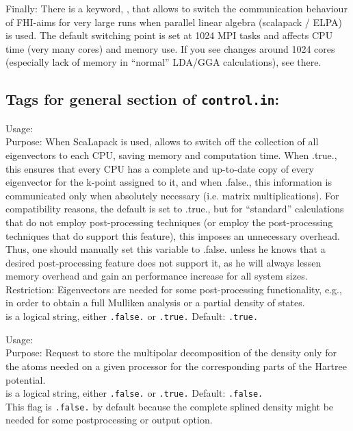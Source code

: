Finally: There is a keyword, , that allows
to switch the communication behaviour of FHI-aims for very large runs
when parallel linear algebra (scalapack / ELPA) is used. The default
switching point is set at 1024 MPI tasks and affects CPU time (very
many cores) and memory use. If you see changes around 1024 cores
(especially lack of memory in ``normal'' LDA/GGA calculations), see
there. 

\newpage

\subsection*{Tags for general section of \texttt{control.in}:}

{
  \noindent
  Usage:   \\[1.0ex]
  Purpose: When ScaLapack is used, allows to switch off the collection
    of all eigenvectors to each CPU, saving memory and computation
    time.  When .true., this ensures that every CPU has a complete and 
    up-to-date copy of every eigenvector for the k-point assigned to it,
    and when .false., this information is communicated only when absolutely
    necessary (i.e. matrix multiplications).  For compatibility reasons, 
    the default is set to .true., but for ``standard'' calculations that 
    do not employ post-processing techniques (or employ the post-processing 
    techniques that do support this feature), this imposes an unnecessary 
    overhead.  Thus, one should manually set this variable to .false. 
    unless he knows that a desired post-processing feature does not support 
    it, as he will always lessen memory overhead and gain an performance 
    increase for all system sizes.  \\[1.0ex] 
  Restriction: Eigenvectors are needed for some post-processing
    functionality, e.g., in order to obtain a full Mulliken analysis
    or a partial density of states. \\[1.0ex]
   is a logical string, either \texttt{.false.} or
    \texttt{.true.} Default: \texttt{.true.} \\
}

{
  \noindent
  Usage:   \\[1.0ex]
  Purpose: Request to store the multipolar decomposition of the density only for
  the atoms needed on a given processor for the corresponding parts of the
  Hartree potential.
  \\[1.0ex]
   is a logical string, either \texttt{.false.} or
    \texttt{.true.} Default: \texttt{.false.}  \\
}
This flag is \texttt{.false.} by default because the complete splined density
might be needed for some postprocessing or output option.



